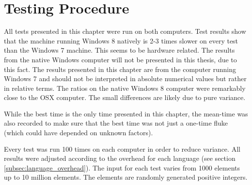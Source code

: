 \section{Testing Procedure}
All tests presented in this chapter were run on both computers. Test results show that the machine running Windows 8 natively is 2-3 times slower on every test than the Windows 7 machine. This seems to be hardware related. The results from the native Windows computer will not be presented in this thesis, due to this fact. The results presented in this chapter are from the computer running Windows 7 and should not be interpreted in absolute numerical values but rather in relative terms. The ratios on the native Windows 8 computer were remarkably close to the OSX computer. The small differences are likely due to pure variance.

While the best time is the only time presented in this chapter, the mean-time was also recorded to make sure that the best time was not just a one-time fluke (which could have depended on unknown factors). 

Every test was run 100 times on each computer in order to reduce variance. All results were adjusted according to the overhead for each language (see section \ref{subsec:language_overhead}). The input for each test varies from 1000 elements up to 10 million elements. The elements are randomly generated positive integers. 